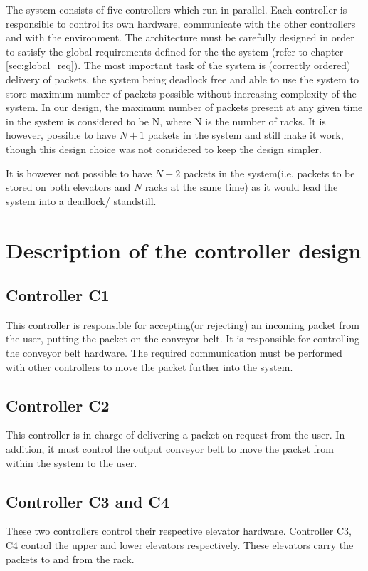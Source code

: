 The system consists of five controllers which run in parallel. Each controller is responsible to control its own hardware, communicate with the other controllers and  with the environment. The architecture must be carefully designed in order to satisfy the global requirements defined for the the system (refer to chapter \ref{sec:global_req}). The most important task of the system is (correctly ordered) delivery of packets, the system being deadlock free and able to use the system to store maximum number of packets possible without increasing complexity of the system. In our design, the maximum number of packets present at any given time in the system is considered to be N, where N is the number of racks. It is however, possible to have $N+1$ packets in the system and still make it work, though this design choice was not considered to keep the design simpler.

It is however not possible to have $N+2$ packets in the system(i.e. packets to be stored on both elevators and $N$ racks at the same time) as it would lead the system into a deadlock/ standstill.

\section*{Description of the controller design}
\subsection*{Controller \textbf{C1}}
This controller is responsible for accepting(or rejecting) an incoming packet from the user, putting the packet on the conveyor belt. It is responsible for controlling the conveyor belt hardware. The required communication must be performed with other controllers to move the packet further into the system.
\subsection*{Controller \textbf{C2}}
This controller is in charge of delivering a packet on request from the user. In addition, it must control the output conveyor belt to move the packet from within the system to the user.
\subsection*{Controller \textbf{C3 and C4}}
These two controllers control their respective elevator hardware. Controller C3, C4 control the upper and lower elevators respectively.
These elevators carry the packets to and from the rack.
